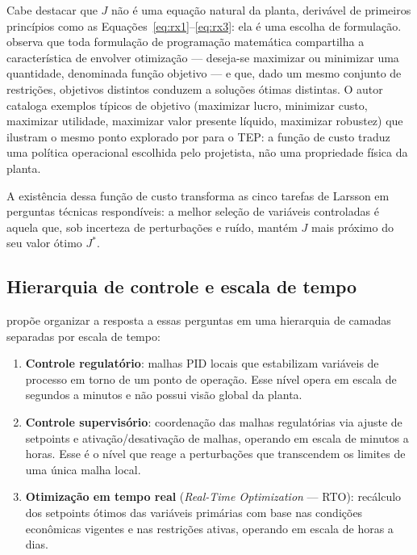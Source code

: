 Cabe destacar que $J$ não é uma equação natural da planta, derivável de primeiros princípios como
as Equações~\ref{eq:rx1}--\ref{eq:rx3}: ela é uma escolha de formulação. 
observa que toda formulação de programação matemática compartilha a característica de envolver
otimização — deseja-se maximizar ou minimizar uma quantidade, denominada função objetivo — e que,
dado um mesmo conjunto de restrições, objetivos distintos conduzem a soluções ótimas distintas.
O autor cataloga exemplos típicos de objetivo (maximizar lucro, minimizar custo, maximizar
utilidade, maximizar valor presente líquido, maximizar robustez) que ilustram o mesmo ponto
explorado por  para o TEP: a função de custo traduz uma política
operacional escolhida pelo projetista, não uma propriedade física da planta.

A existência dessa função de custo transforma as cinco tarefas de Larsson em perguntas técnicas
respondíveis: a melhor seleção de variáveis controladas é aquela que, sob incerteza de perturbações
e ruído, mantém $J$ mais próximo do seu valor ótimo $J^*$.

\subsection{Hierarquia de controle e escala de tempo}

 propõe organizar a resposta a essas perguntas em uma hierarquia de
camadas separadas por escala de tempo:

\begin{enumerate}
	\item \textbf{Controle regulatório}: malhas PID locais que estabilizam variáveis de processo em
	      torno de um ponto de operação. Esse nível opera em escala de segundos a minutos e não possui
	      visão global da planta.
	\item \textbf{Controle supervisório}: coordenação das malhas regulatórias via ajuste de setpoints
	      e ativação/desativação de malhas, operando em escala de minutos a horas. Esse é o nível que
	      reage a perturbações que transcendem os limites de uma única malha local.
	\item \textbf{Otimização em tempo real} (\textit{Real-Time Optimization} --- RTO): recálculo dos
	      setpoints ótimos das variáveis primárias com base nas condições econômicas vigentes e nas
	      restrições ativas, operando em escala de horas a dias.
\end{enumerate}

